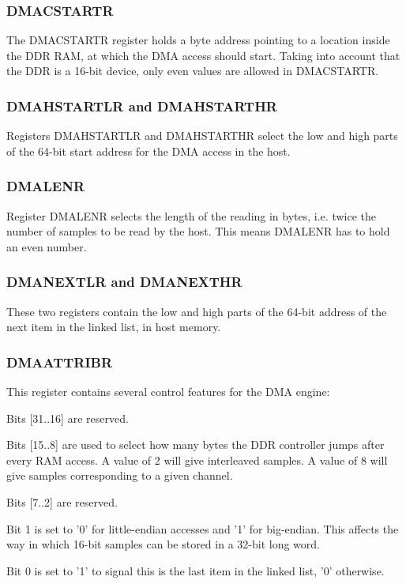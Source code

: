 \documentclass[10pt,a4paper]{cerndoc}
\begin{document}
\subsubsection{DMACSTARTR}
The DMACSTARTR register holds a byte address pointing to a location inside the DDR RAM, at which the DMA access should start. Taking into account that the DDR is a 16-bit device, only even values are allowed in DMACSTARTR.

\subsubsection{DMAHSTARTLR and DMAHSTARTHR}
Registers DMAHSTARTLR and DMAHSTARTHR select the low and high parts of the 64-bit start address for the DMA access in the host. 

\subsubsection{DMALENR}
Register DMALENR selects the length of the reading in bytes, i.e. twice the number of samples to be read by the host. This means DMALENR has to hold an even number.

\subsubsection{DMANEXTLR and DMANEXTHR}
These two registers contain the low and high parts of the 64-bit address of the next item in the linked list, in host memory.

\subsubsection{DMAATTRIBR}
This register contains several control features for the DMA engine:
\begin{packed_item}
\item Bits [31..16] are reserved.
\item Bits [15..8] are used to select how many bytes the DDR controller jumps after every RAM access. A value of 2 will give interleaved samples. A value of 8 will give samples corresponding to a given channel.
\item Bits [7..2] are reserved.
\item Bit 1 is set to '0' for little-endian accesses and '1' for big-endian. This affects the way in which 16-bit samples can be stored in a 32-bit long word.
\item Bit 0 is set to '1' to signal this is the last item in the linked list, '0' otherwise.
\end{packed_item}
\end{document}
